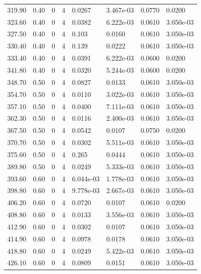 \documentclass[preview]{standalone}
\begin{document}
{{{{\begin{tabular}{L{1.2cm}C{1.2cm} C{0.3cm}C{0.5cm} C{1.4cm}C{1.4cm} C{1.4cm}C{1.4cm}}
  319.90  &  0.40  & 0     &  4 &  0.0267  & 3.467e-03  & 0.0770 &  0.0200   \\ 
  323.60  &  0.40  & 0     &  4 &  0.0382  & 6.222e-03  & 0.0610 &  3.050e-03   \\ 
  327.50  &  0.40  & 0     &  4 &  0.103  & 0.0160  & 0.0610 &  3.050e-03   \\ 
  330.40  &  0.40  & 0     &  4 &  0.139  & 0.0222  & 0.0610 &  3.050e-03   \\ 
  333.40  &  0.40  & 0     &  4 &  0.0391  & 6.222e-03  & 0.0600 &  0.0200   \\ 
  341.80  &  0.40  & 0     &  4 &  0.0320  & 5.244e-03  & 0.0600 &  0.0200   \\ 
  348.70  &  0.50  & 0     &  4 &  0.0827  & 0.0133  & 0.0610 &  3.050e-03   \\ 
  354.70  &  0.50  & 0     &  4 &  0.0110  & 3.022e-03  & 0.0610 &  3.050e-03   \\ 
  357.10  &  0.50  & 0     &  4 &  0.0400  & 7.111e-03  & 0.0610 &  3.050e-03   \\ 
  362.30  &  0.50  & 0     &  4 &  0.0116  & 2.400e-03  & 0.0610 &  3.050e-03   \\ 
  367.50  &  0.50  & 0     &  4 &  0.0542  & 0.0107  & 0.0750 &  0.0200   \\ 
  370.70  &  0.50  & 0     &  4 &  0.0302  & 5.511e-03  & 0.0610 &  3.050e-03   \\ 
  375.60  &  0.50  & 0     &  4 &  0.265  & 0.0444  & 0.0610 &  3.050e-03   \\ 
  389.80  &  0.50  & 0     &  4 &  0.0249  & 5.333e-03  & 0.0610 &  3.050e-03   \\ 
  393.60  &  0.60  & 0     &  4 &  6.044e-03  & 1.778e-03  & 0.0610 &  3.050e-03   \\ 
  398.80  &  0.60  & 0     &  4 &  9.778e-03  & 2.667e-03  & 0.0610 &  3.050e-03   \\ 
  406.20  &  0.60  & 0     &  4 &  0.0720  & 0.0107  & 0.0610 &  0.0200   \\ 
  408.80  &  0.60  & 0     &  4 &  0.0133  & 3.556e-03  & 0.0610 &  3.050e-03   \\ 
  412.90  &  0.60  & 0     &  4 &  0.0302  & 0.0107  & 0.0610 &  3.050e-03   \\ 
  414.90  &  0.60  & 0     &  4 &  0.0978  & 0.0178  & 0.0610 &  3.050e-03   \\ 
  418.80  &  0.60  & 0     &  4 &  0.0249  & 5.422e-03  & 0.0610 &  3.050e-03   \\ 
  426.10  &  0.60  & 0     &  4 &  0.0809  & 0.0151  & 0.0610 &  3.050e-03   \\ 

\end{tabular}}}}}
\end{document}
